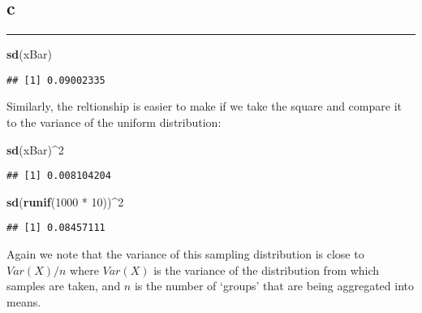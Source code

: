 \documentclass[]{tufte-handout}
\newenvironment{Shaded}{}{}
\newcommand{\DecValTok}[1]{\textcolor[rgb]{0.25,0.63,0.44}{#1}}
\newcommand{\KeywordTok}[1]{\textcolor[rgb]{0.00,0.44,0.13}{\textbf{#1}}}
\newcommand{\NormalTok}[1]{#1}
\newcommand{\OperatorTok}[1]{\textcolor[rgb]{0.40,0.40,0.40}{#1}}
\newcommand{\StringTok}[1]{\textcolor[rgb]{0.25,0.44,0.63}{#1}}
\begin{document}
\hypertarget{c-6}{%
\subsection{c}\label{c-6}}

\begin{center}\rule{0.5\linewidth}{0.5pt}\end{center}

\begin{Shaded}
\begin{Highlighting}[]
\KeywordTok{sd}\NormalTok{(xBar)}
\end{Highlighting}
\end{Shaded}

\begin{verbatim}
## [1] 0.09002335
\end{verbatim}

Similarly, the reltionship is easier to make if we take the square and
compare it to the variance of the uniform distribution:

\begin{Shaded}
\begin{Highlighting}[]
\KeywordTok{sd}\NormalTok{(xBar)}\OperatorTok{^}\DecValTok{2}
\end{Highlighting}
\end{Shaded}

\begin{verbatim}
## [1] 0.008104204
\end{verbatim}

\begin{Shaded}
\begin{Highlighting}[]
\KeywordTok{sd}\NormalTok{(}\KeywordTok{runif}\NormalTok{(}\DecValTok{1000} \OperatorTok{*}\StringTok{ }\DecValTok{10}\NormalTok{))}\OperatorTok{^}\DecValTok{2}
\end{Highlighting}
\end{Shaded}

\begin{verbatim}
## [1] 0.08457111
\end{verbatim}

Again we note that the variance of this sampling distribution is close
to \(Var(X)/n\) where \(Var(X)\) is the variance of the distribution
from which samples are taken, and \(n\) is the number of `groups' that
are being aggregated into means.
\end{document}
